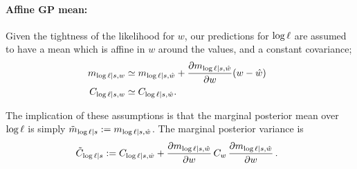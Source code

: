 \documentclass{article}
\begin{document}
\paragraph*{Affine GP mean:} Given the tightness of the likelihood for $w$, our predictions for $\tr$ are assumed to have a \gpb mean which is affine in $w$ around the  values, and a constant covariance;
\begin{align}
\hspace{-0.2cm} m_{\tr|s,w} & \simeq m_{\tr|s,\hat{w}} 
 + \pderiv{m_{\tr|s,\hat{w}}}{w} (w- \hat{w})\\
 \hspace{-0.2cm} C_{\tr|s, w} & \simeq C_{\tr|s, \hat{w}}.
\end{align}
 
The implication of these assumptions is that the marginal posterior mean over $\tr$ is simply
$
\tilde{m}_{\tr|s} \deq m_{\tr|s,\hat{w}}
$.   
The marginal posterior variance is 
\begin{equation}
\hspace{-0.2cm}
\tilde{C}_{\tr|s} 
\deq C_{\tr|s,\hat{w}}
+ 
\pderiv{m_{\tr|s,\hat{w}}}{w}
\,C_w\,
\pderiv{m_{\tr|s,\hat{w}}}{w}\,.
\end{equation}
\end{document}

